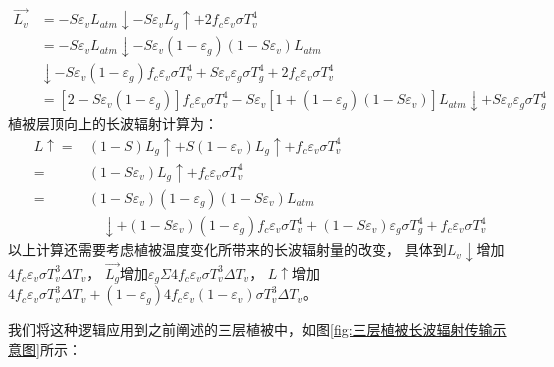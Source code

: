 \begin{equation}
\begin{aligned} \overrightarrow{L_{v}} &=-S \varepsilon_{v} L_{atm} \downarrow-S \varepsilon_{v} L_{g} 
    \uparrow+2 f_{c} \varepsilon_{v} \sigma T_{v}^{4} \\ &=-S \varepsilon_{v} L_{atm} \downarrow-S 
    \varepsilon_{v}\left(1-\varepsilon_{g}\right)\left(1-S \varepsilon_{v}\right) L_{atm} \\ & 
    \downarrow-S \varepsilon_{v}\left(1-\varepsilon_{g}\right) f_{c} \varepsilon_{v} \sigma T_{v}^{4}+S
     \varepsilon_{v} \varepsilon_{g} \sigma T_{g}^{4}+2 f_{c} \varepsilon_{v} \sigma T_{v}^{4} \\ 
     &=\left[2-S \varepsilon_{v}\left(1-\varepsilon_{g}\right)\right] f_{c} \varepsilon_{v} 
     \sigma T_{v}^{4}-S \varepsilon_{v}\left[1+\left(1-\varepsilon_{g}\right)\left(1-S \varepsilon_{v}\right)\right]
      L_{atm} \downarrow+S \varepsilon_{v} \varepsilon_{g} \sigma T_{g}^{4} \end{aligned}
\end{equation}
植被层顶向上的长波辐射计算为：
\begin{equation}
\begin{aligned} L \uparrow=&(1-S) L_{g} \uparrow+S\left(1-\varepsilon_{v}\right) L_{g} 
    \uparrow+f_{c} \varepsilon_{v} \sigma T_{v}^{4} \\=&\left(1-S \varepsilon_{v}\right) L_{g}
     \uparrow+f_{c} \varepsilon_{v} \sigma T_{v}^{4} \\=&\left(1-S \varepsilon_{v}\right)\left(1-\varepsilon_{g}\right)\left(1-S \varepsilon_{v}\right) L_{atm} \\
      & \quad \downarrow+\left(1-S \varepsilon_{v}\right)\left(1-\varepsilon_{g}\right) f_{c} \varepsilon_{v} \sigma T_{v}^{4}+\left(1-S \varepsilon_{v}\right) 
      \varepsilon_{g} \sigma T_{g}^{4}+f_{c} \varepsilon_{v} \sigma T_{v}^{4} \end{aligned}
\end{equation}
以上计算还需要考虑植被温度变化所带来的长波辐射量的改变，
具体到$L_v\downarrow$增加$4f_c\varepsilon_v\sigma T_v^3\Delta T_v$，
$\overrightarrow{L_{g}}$增加$\varepsilon_{g} \Sigma 4 f_{c} \varepsilon_{v} \sigma T_{v}^{3} \Delta T_{v}$，
$L\uparrow$增加$4 f_{c} \varepsilon_{v} \sigma T_{v}^{3} \Delta T_{v}+\left(1-\varepsilon_{g}\right) 4 f_{c} 
\varepsilon_{v}\left(1-\varepsilon_{v}\right) \sigma T_{v}^{3} \Delta T_{v}$。



我们将这种逻辑应用到之前阐述的三层植被中，如图\ref{fig:三层植被长波辐射传输示意图}所示：

